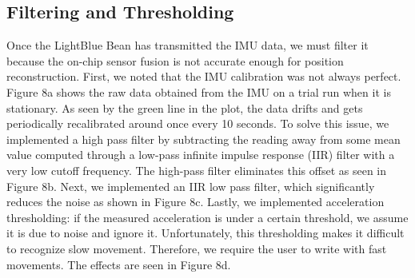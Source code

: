 \documentclass[12pt,journal]{IEEEtran}
\begin{document}
\subsection{Filtering and Thresholding}
  Once the LightBlue Bean has transmitted the IMU data, we must filter it because the on-chip sensor fusion is not accurate enough for position reconstruction. First, we noted that the IMU calibration was not always perfect. Figure 8a shows the raw data obtained from the IMU on a trial run when it is stationary. As seen by the green line in the plot, the data drifts and gets periodically recalibrated around once every 10 seconds. To solve this issue, we implemented a high pass filter by subtracting the reading away from some mean value computed through a low-pass infinite impulse response (IIR) filter with a very low cutoff frequency. The high-pass filter eliminates this offset as seen in Figure 8b.
  Next, we implemented an IIR low pass filter, which significantly reduces the noise as shown in Figure 8c.
  Lastly, we implemented acceleration thresholding: if the measured acceleration is under a certain threshold, we assume it is due to noise and ignore it. Unfortunately, this thresholding makes it difficult to recognize slow movement. Therefore, we require the user to write with fast movements. The effects are seen in Figure 8d.
\end{document}
